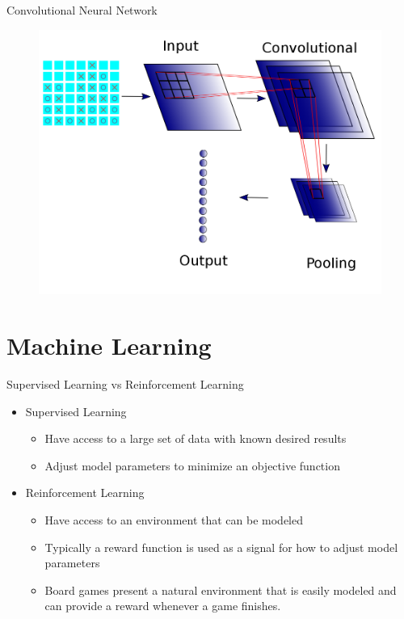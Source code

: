 \begin{frame}[plain]{Convolutional Neural Network}
\begin{figure}
\includegraphics[width = 0.8 \textwidth]{"cnn"}
\end{figure}
\end{frame}

\section{Machine Learning}

\begin{frame}[plain]{Supervised Learning vs Reinforcement Learning}
\begin{itemize}
\item Supervised Learning
\begin{itemize}
\item Have access to a large set of data with known desired results
\item Adjust model parameters to minimize an objective function
\end{itemize}
\item Reinforcement Learning
\begin{itemize}
\item Have access to an environment that can be modeled
\item Typically a reward function is used as a signal for how to adjust model parameters
\item Board games present a natural environment that is easily modeled and can provide a reward whenever a game finishes.
\end{itemize}
\end{itemize}
\end{frame}


